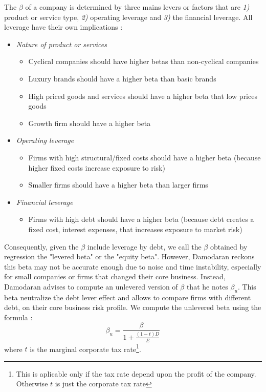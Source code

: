 The $\beta$ of a company is determined by three mains levers or factors that are \textit{1)} product or service type, \textit{2)} operating leverage and \textit{3)} the financial leverage. All leverage have their own implications : 
\begin{itemize}
    \item \textit{Nature of product or services}
    \begin{itemize}
    \item Cyclical companies should have higher betas than non-cyclical companies

    \item Luxury brands should have a higher beta than basic brands

    \item High priced goods and services should have a higher beta that low prices goods

    \item Growth firm should have a higher beta
    \end{itemize}

    \item \textit{Operating leverage}
    \begin{itemize}
        \item Firms with high structural/fixed costs should have a higher beta (because higher fixed costs increase exposure to risk)

        \item Smaller firms should have a higher beta than larger firms
    \end{itemize}

    \item \textit{Financial leverage}

    \begin{itemize}
        \item Firms with high debt should have a higher beta (because debt creates a fixed cost, interest expenses, that increases exposure to market risk)
    \end{itemize}
    
\end{itemize}

Consequently, given  the $\beta$ include leverage by debt, we call the $\beta$ obtained by regression the "levered beta" or the "equity beta". However, Damodaran reckons this beta may not be accurate enough due to noise and time instability, especially for small companies or firms that changed their core business. Instead, Damodaran advises to compute an unlevered version of $\beta$ that he notes $\beta_u$. This beta neutralize the debt lever effect and allows to compare firms with different debt, on their core business risk profile. We compute the unlevered beta using the formula : 
\begin{equation}
   \displaystyle \beta_u = \frac{\beta}{1+\frac{(1-t)D}{E}} 
\end{equation}
where $t$ is the marginal corporate tax rate\footnote{This is aplicable only if the tax rate depend upon the profit of the company. Otherwise $t$ is just the corporate tax rate}. 

